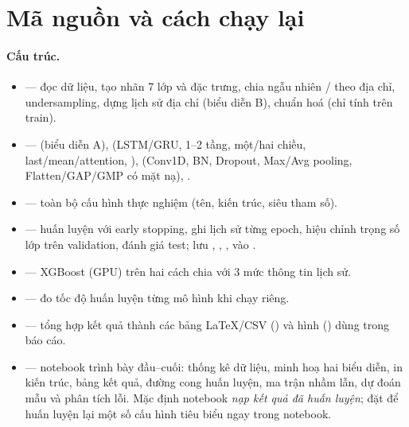 \section{Mã nguồn và cách chạy lại}\label{app:code}

\paragraph{Cấu trúc.}
\begin{itemize}
\item {} --- đọc dữ liệu, tạo nhãn 7 lớp và đặc trưng, chia ngẫu nhiên / theo địa chỉ, undersampling, dựng lịch sử
  địa chỉ (biểu diễn B), chuẩn hoá (chỉ tính trên train).
\item {} ---  (biểu diễn A),  (LSTM/GRU, 1--2 tầng, một/hai chiều,
  last/mean/attention, ),  (Conv1D, BN, Dropout, Max/Avg pooling, Flatten/GAP/GMP có mặt nạ),
  .
\item {} --- toàn bộ cấu hình thực nghiệm (tên, kiến trúc, siêu tham số).
\item {} --- huấn luyện với early stopping, ghi lịch sử từng epoch, hiệu chỉnh trọng số lớp trên validation,
  đánh giá test; lưu , , ,  vào
  .
\item {} --- XGBoost (GPU) trên hai cách chia với 3 mức thông tin lịch sử.
\item {} --- đo tốc độ huấn luyện từng mô hình khi chạy riêng.
\item {} --- tổng hợp kết quả thành các bảng LaTeX/CSV () và hình
  () dùng trong báo cáo.
\item {} --- notebook trình bày đầu--cuối: thống kê dữ liệu, minh hoạ hai biểu diễn, in kiến trúc, bảng kết quả,
  đường cong huấn luyện, ma trận nhầm lẫn, dự đoán mẫu và phân tích lỗi. Mặc định notebook \emph{nạp kết quả đã huấn luyện};
  đặt  để huấn luyện lại một số cấu hình tiêu biểu ngay trong notebook.
\end{itemize}

